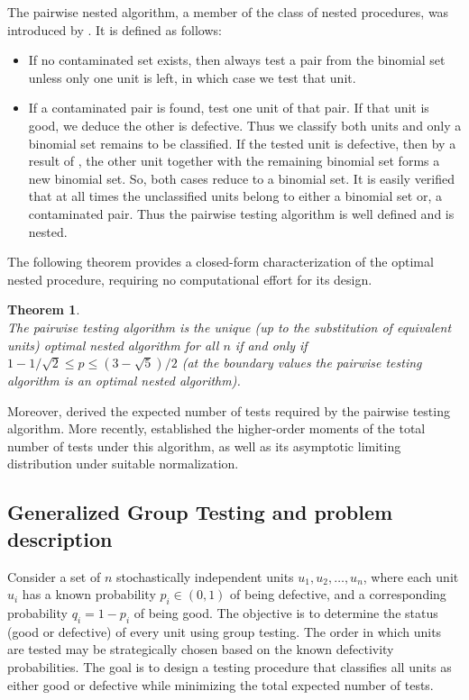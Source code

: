 \documentclass[12pt]{article}
\newtheorem{thm}{Theorem}
\begin{document}
The pairwise nested algorithm, a member of the class of nested procedures, was introduced by \cite{YH1990}. It is defined as follows:
\smallskip

{\it
\begin{itemize}
\item[(i)]
If no contaminated set exists, then always test a pair from the binomial set
unless only one unit is left, in which case we test that unit.
\item[(ii)]
If a contaminated pair is found, test one unit of that pair. If that unit is
good, we deduce the other is defective. Thus we classify both units and only a
binomial set remains to be classified. If the tested unit is defective, then by a result
of \cite{SG1959}, the other unit together with the remaining binomial set
forms a new binomial set. So, both cases reduce to a binomial set.
It is easily verified that at all times the unclassified units belong to either a
binomial set or, a contaminated pair. Thus the pairwise testing algorithm is well
defined and is nested.
\end{itemize}
}
The following theorem provides a closed-form characterization of the optimal nested procedure, requiring no computational effort for its design.
\begin{thm}{\bf \cite{YH1990}}\\
\label{re:YH}
The pairwise testing algorithm is the unique (up to the substitution of
equivalent units) optimal nested algorithm for all $n$ if and only if $1-1/\sqrt{2}\leq p \leq (3-\sqrt{5})/2$ (at the boundary values the pairwise testing algorithm is an optimal
nested algorithm).
\end{thm}

Moreover, \cite{YH1990} derived the expected number of tests required by the pairwise testing algorithm. More recently, \cite{CS2024} established the higher-order moments of the total number of tests under this algorithm, as well as its asymptotic limiting distribution under suitable normalization.

\subsection{Generalized Group Testing and problem description}
Consider a set of \( n \) stochastically independent units \( u_1, u_2, \ldots, u_n \), where each unit \( u_i \) has a known probability \( p_i \in (0,1) \) of being defective, and a corresponding probability \( q_i = 1 - p_i \) of being good.
The objective is to determine the status (good or defective) of every unit using group testing. The order in which units are tested may be strategically chosen based on the known defectivity probabilities. The goal is to design a testing procedure that classifies all units as either good or defective while minimizing the total expected number of tests.
\end{document}
